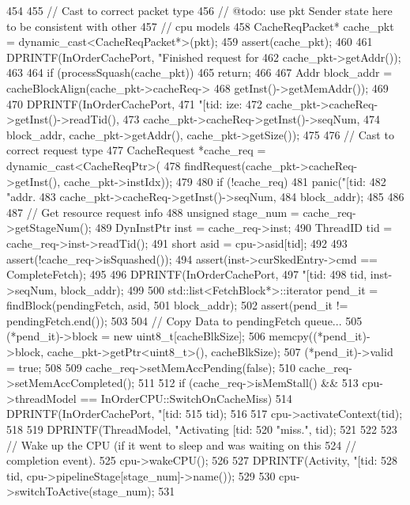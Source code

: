 \begin{DoxyCode}
454 {
455     // Cast to correct packet type
456     // @todo: use pkt Sender state here to be consistent with other
457     // cpu models
458     CacheReqPacket* cache_pkt = dynamic_cast<CacheReqPacket*>(pkt);
459     assert(cache_pkt);
460 
461     DPRINTF(InOrderCachePort, "Finished request for %
462             cache_pkt->getAddr());
463 
464     if (processSquash(cache_pkt))
465         return;
466 
467     Addr block_addr = cacheBlockAlign(cache_pkt->cacheReq->
468                                       getInst()->getMemAddr());
469 
470     DPRINTF(InOrderCachePort,
471             "[tid:%
      ize:%
472             cache_pkt->cacheReq->getInst()->readTid(),
473             cache_pkt->cacheReq->getInst()->seqNum,
474             block_addr, cache_pkt->getAddr(), cache_pkt->getSize());
475 
476     // Cast to correct request type
477     CacheRequest *cache_req = dynamic_cast<CacheReqPtr>(
478         findRequest(cache_pkt->cacheReq->getInst(), cache_pkt->instIdx));
479 
480     if (!cache_req) {
481         panic("[tid:%
482               "addr. %
483               cache_pkt->cacheReq->getInst()->seqNum,
484               block_addr);
485     }
486 
487     // Get resource request info
488     unsigned stage_num = cache_req->getStageNum();
489     DynInstPtr inst = cache_req->inst;
490     ThreadID tid = cache_req->inst->readTid();
491     short asid = cpu->asid[tid];
492 
493     assert(!cache_req->isSquashed());
494     assert(inst->curSkedEntry->cmd == CompleteFetch);
495 
496     DPRINTF(InOrderCachePort,
497             "[tid:%
498             tid, inst->seqNum, block_addr);
499 
500     std::list<FetchBlock*>::iterator pend_it = findBlock(pendingFetch, asid,
501                                                          block_addr);
502     assert(pend_it != pendingFetch.end());
503 
504     // Copy Data to pendingFetch queue...
505     (*pend_it)->block = new uint8_t[cacheBlkSize];
506     memcpy((*pend_it)->block, cache_pkt->getPtr<uint8_t>(), cacheBlkSize);
507     (*pend_it)->valid = true;
508 
509     cache_req->setMemAccPending(false);
510     cache_req->setMemAccCompleted();
511 
512     if (cache_req->isMemStall() &&
513         cpu->threadModel == InOrderCPU::SwitchOnCacheMiss) {
514         DPRINTF(InOrderCachePort, "[tid:%
515                 tid);
516 
517         cpu->activateContext(tid);
518 
519         DPRINTF(ThreadModel, "Activating [tid:%
520                 "miss.\n", tid);
521     }
522 
523     // Wake up the CPU (if it went to sleep and was waiting on this
524     // completion event).
525     cpu->wakeCPU();
526 
527     DPRINTF(Activity, "[tid:%
528             tid, cpu->pipelineStage[stage_num]->name());
529 
530     cpu->switchToActive(stage_num);
531 }
\end{DoxyCode}
